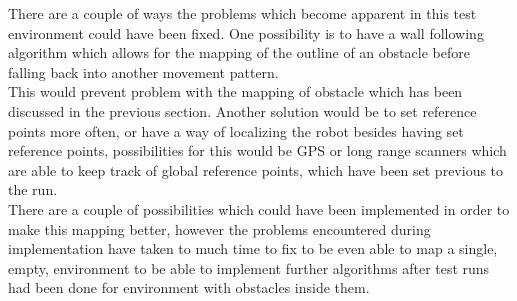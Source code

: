 There are a couple of ways the problems which become apparent in this test environment could have been fixed. One possibility is to have a wall following algorithm which allows for the mapping of the outline of an obstacle before falling back into another movement pattern. \\
This would prevent problem with the mapping of obstacle which has been discussed in the previous section. Another solution would be to set reference points more often, or have a way of localizing the robot besides having set reference points, possibilities for this would be GPS or long range scanners which are able to keep track of global reference points, which have been set previous to the run.\\
There are a couple of possibilities which could have been implemented in order to make this mapping better, however the problems encountered during implementation have taken to much time to fix to be even able to map a single, empty, environment to be able to implement further algorithms after test runs had been done for environment with obstacles inside them.